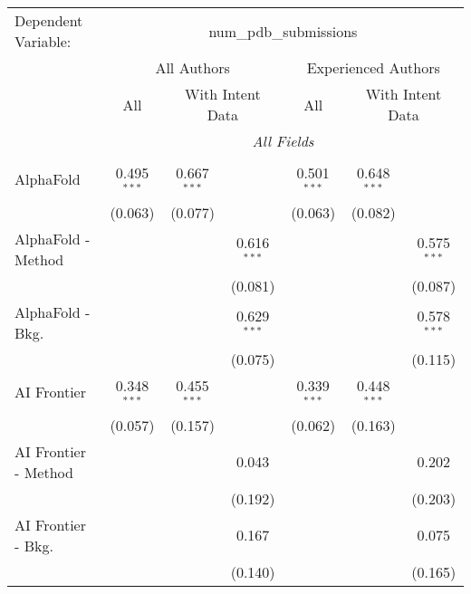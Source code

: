 \begingroup
\centering
\begin{tabular}{lcccccc}
   \tabularnewline \midrule \midrule
   Dependent Variable: & \multicolumn{6}{c}{num\_pdb\_submissions}\\
 & \multicolumn{3}{c}{All Authors} & \multicolumn{3}{c}{Experienced Authors} \\
\cmidrule(lr){2-4} \cmidrule(lr){5-7}
 & \multicolumn{1}{c}{All} & \multicolumn{2}{c}{With Intent Data} & \multicolumn{1}{c}{All} & \multicolumn{2}{c}{With Intent Data} \\
\cmidrule(lr){2-2} \cmidrule(lr){3-4} \cmidrule(lr){5-5} \cmidrule(lr){6-7}
 & \multicolumn{6}{c}{\textit{All Fields}} \\ \\
   AlphaFold            & 0.495$^{***}$ & 0.667$^{***}$ &               & 0.501$^{***}$ & 0.648$^{***}$ &   \\   
                        & (0.063)       & (0.077)       &               & (0.063)       & (0.082)       &   \\   
   AlphaFold - Method   &               &               & 0.616$^{***}$ &               &               & 0.575$^{***}$\\   
                        &               &               & (0.081)       &               &               & (0.087)\\   
   AlphaFold - Bkg.     &               &               & 0.629$^{***}$ &               &               & 0.578$^{***}$\\   
                        &               &               & (0.075)       &               &               & (0.115)\\   
   AI Frontier          & 0.348$^{***}$ & 0.455$^{***}$ &               & 0.339$^{***}$ & 0.448$^{***}$ &   \\   
                        & (0.057)       & (0.157)       &               & (0.062)       & (0.163)       &   \\   
   AI Frontier - Method &               &               & 0.043         &               &               & 0.202\\   
                        &               &               & (0.192)       &               &               & (0.203)\\   
   AI Frontier - Bkg.   &               &               & 0.167         &               &               & 0.075\\   
                        &               &               & (0.140)       &               &               & (0.165)\\   

\end{tabular}
